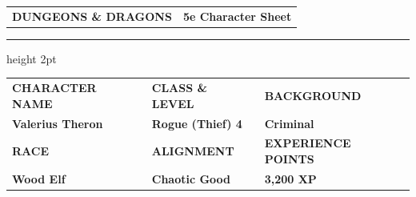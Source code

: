 \documentclass[10pt]{article}
\begin{document}
\begin{center}
  \begin{tabularx}{\linewidth}{@{} X r @{}}
    {\Huge\bfseries\color{accent} DUNGEONS \& DRAGONS} & {\Large\bfseries\color{charcoal} 5e Character Sheet} \\
  \end{tabularx}
  \vspace{-2pt}
  {\color{accent}\hrule height 2pt}
\end{center}
\vspace{6pt}

\begin{tcolorbox}[
  colback=parchment,
  colframe=charcoal,
  sharp corners,
  boxrule=1.2pt,
  left=8pt, right=8pt, top=6pt, bottom=6pt
]
  \scriptsize
  \renewcommand{\arraystretch}{1.1}
  \begin{tabularx}{\linewidth}{@{} X X X @{}}
    {\color{accent}\bfseries CHARACTER NAME} & {\color{accent}\bfseries CLASS \& LEVEL} & {\color{accent}\bfseries BACKGROUND} \\
    {\large\bfseries Valerius Theron} & {\large\bfseries Rogue (Thief) 4} & {\large\bfseries Criminal} \\[8pt]
    {\color{accent}\bfseries RACE} & {\color{accent}\bfseries ALIGNMENT} & {\color{accent}\bfseries EXPERIENCE POINTS} \\
    {\large\bfseries Wood Elf} & {\large\bfseries Chaotic Good} & {\large\bfseries 3,200 XP}
  \end{tabularx}
\end{tcolorbox}
\vspace{8pt}
\end{document}
